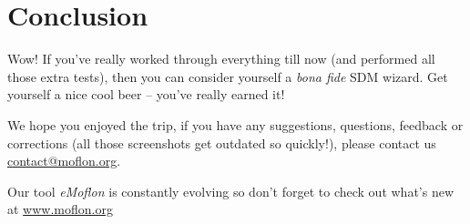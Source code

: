 \chapter{Conclusion} 

Wow!  If you've really worked through everything till now (and performed all those
extra tests), then you can consider yourself a \emph{bona fide} SDM wizard.  Get
yourself a nice cool beer -- you've really earned it!

We hope you enjoyed the trip, if you have any suggestions, questions,
feedback or corrections (all those screenshots get outdated so quickly!), please
contact us \url{contact@moflon.org}.

Our tool \emph{eMoflon} is constantly evolving so don't forget to check out
what's new at \url{www.moflon.org}

 